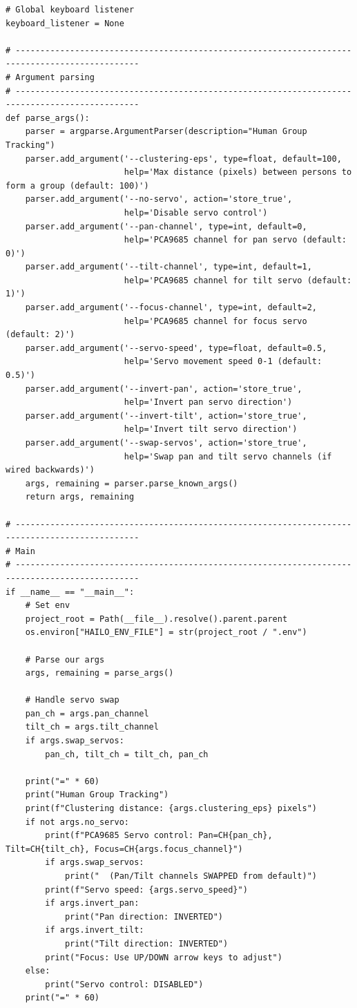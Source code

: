 \documentclass[11pt,a4paper]{article}
\begin{document}
\begin{lstlisting}
# Global keyboard listener
keyboard_listener = None

# -----------------------------------------------------------------------------------------------
# Argument parsing
# -----------------------------------------------------------------------------------------------
def parse_args():
    parser = argparse.ArgumentParser(description="Human Group Tracking")
    parser.add_argument('--clustering-eps', type=float, default=100,
                        help='Max distance (pixels) between persons to form a group (default: 100)')
    parser.add_argument('--no-servo', action='store_true',
                        help='Disable servo control')
    parser.add_argument('--pan-channel', type=int, default=0,
                        help='PCA9685 channel for pan servo (default: 0)')
    parser.add_argument('--tilt-channel', type=int, default=1,
                        help='PCA9685 channel for tilt servo (default: 1)')
    parser.add_argument('--focus-channel', type=int, default=2,
                        help='PCA9685 channel for focus servo (default: 2)')
    parser.add_argument('--servo-speed', type=float, default=0.5,
                        help='Servo movement speed 0-1 (default: 0.5)')
    parser.add_argument('--invert-pan', action='store_true',
                        help='Invert pan servo direction')
    parser.add_argument('--invert-tilt', action='store_true',
                        help='Invert tilt servo direction')
    parser.add_argument('--swap-servos', action='store_true',
                        help='Swap pan and tilt servo channels (if wired backwards)')
    args, remaining = parser.parse_known_args()
    return args, remaining

# -----------------------------------------------------------------------------------------------
# Main
# -----------------------------------------------------------------------------------------------
if __name__ == "__main__":
    # Set env
    project_root = Path(__file__).resolve().parent.parent
    os.environ["HAILO_ENV_FILE"] = str(project_root / ".env")
    
    # Parse our args
    args, remaining = parse_args()
    
    # Handle servo swap
    pan_ch = args.pan_channel
    tilt_ch = args.tilt_channel
    if args.swap_servos:
        pan_ch, tilt_ch = tilt_ch, pan_ch
    
    print("=" * 60)
    print("Human Group Tracking")
    print(f"Clustering distance: {args.clustering_eps} pixels")
    if not args.no_servo:
        print(f"PCA9685 Servo control: Pan=CH{pan_ch}, Tilt=CH{tilt_ch}, Focus=CH{args.focus_channel}")
        if args.swap_servos:
            print("  (Pan/Tilt channels SWAPPED from default)")
        print(f"Servo speed: {args.servo_speed}")
        if args.invert_pan:
            print("Pan direction: INVERTED")
        if args.invert_tilt:
            print("Tilt direction: INVERTED")
        print("Focus: Use UP/DOWN arrow keys to adjust")
    else:
        print("Servo control: DISABLED")
    print("=" * 60)
    

\end{lstlisting}
\end{document}
